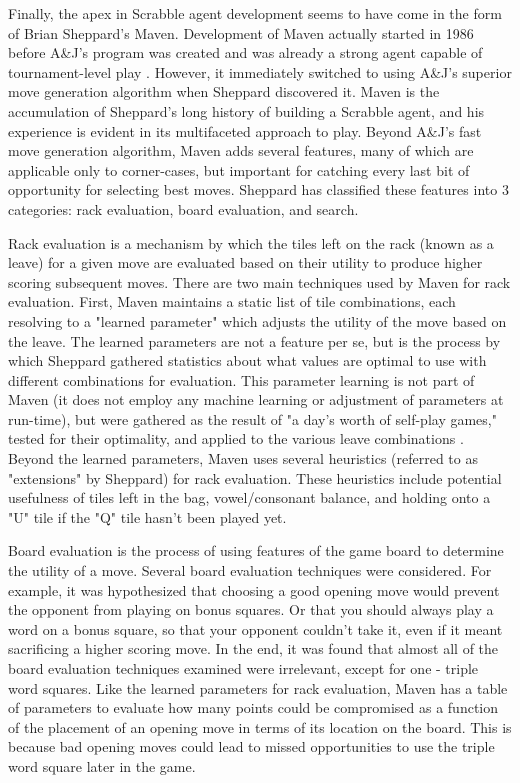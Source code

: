 \documentclass[letterpaper]{article}
\begin{document}
Finally, the apex in Scrabble agent development seems to have come in the form of Brian Sheppard's Maven. Development of Maven actually started in 1986 before A\&J's program was created and was already a strong agent capable of tournament-level play \cite{Schaeffer2001}. However, it immediately switched to using A\&J's superior move generation algorithm when Sheppard discovered it. Maven is the accumulation of Sheppard's long history of building a Scrabble agent, and his experience is evident in its multifaceted approach to play. Beyond A\&J's fast move generation algorithm, Maven adds several features, many of which are applicable only to corner-cases, but important for catching every last bit of opportunity for selecting best moves. Sheppard has classified these features into 3 categories: rack evaluation, board evaluation, and search. 

Rack evaluation is a mechanism by which the tiles left on the rack (known as a leave) for a given move are evaluated based on their utility to produce higher scoring subsequent moves. There are two main techniques used by Maven for rack evaluation. First, Maven maintains a static list of tile combinations, each resolving to a "learned parameter" which adjusts the utility of the move based on the leave. The learned parameters are not a feature per se, but is the process by which Sheppard gathered statistics about what values are optimal to use with different combinations for evaluation. This parameter learning is not part of Maven (it does not employ any machine learning or adjustment of parameters at run-time), but were gathered as the result of "a day's worth of self-play games," tested for their optimality, and applied to the various leave combinations \cite{1sheppard2002}. Beyond the learned parameters, Maven uses several heuristics (referred to as "extensions" by Sheppard) for rack evaluation. These heuristics include potential usefulness of tiles left in the bag, vowel/consonant balance, and holding onto a "U" tile if the "Q" tile hasn't been played yet.

Board evaluation is the process of using features of the game board to determine the utility of a move. Several board evaluation techniques were considered. For example, it was hypothesized that choosing a good opening move would prevent the opponent from playing on bonus squares. Or that you should always play a word on a bonus square, so that your opponent couldn't take it, even if it meant sacrificing a higher scoring move. In the end, it was found that almost all of the board evaluation techniques examined were irrelevant, except for one - triple word squares. Like the learned parameters for rack evaluation, Maven has a table of parameters to evaluate how many points could be compromised as a function of the placement of an opening move in terms of its location on the board. This is because bad opening moves could lead to missed opportunities to use the triple word square later in the game.
\end{document}
